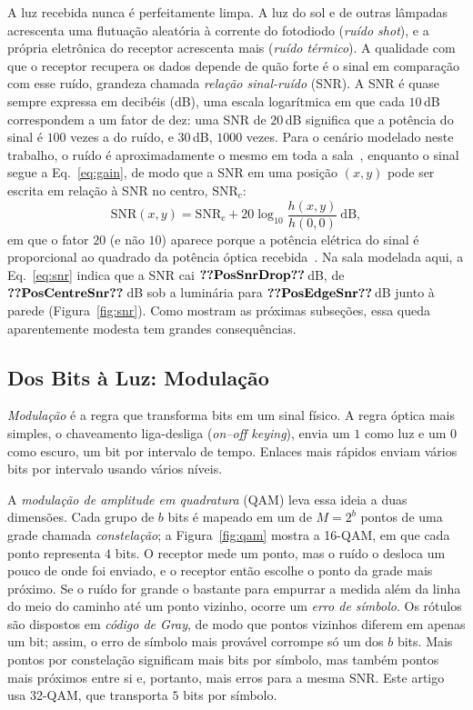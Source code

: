 A luz recebida nunca é perfeitamente limpa. A luz do sol e de outras lâmpadas
acrescenta uma flutuação aleatória à corrente do fotodiodo (\emph{ruído
shot}), e a própria eletrônica do receptor acrescenta mais (\emph{ruído
térmico}). A qualidade com que o receptor recupera os dados depende de quão
forte é o sinal em comparação com esse ruído, grandeza chamada \emph{relação
sinal-ruído} (SNR). A SNR é quase sempre expressa em decibéis (dB), uma escala
logarítmica em que cada $10$\,dB correspondem a um fator de dez: uma SNR de
$20$\,dB significa que a potência do sinal é $100$ vezes a do ruído, e
$30$\,dB, $1000$ vezes. Para o cenário modelado neste trabalho, o ruído é aproximadamente o mesmo em toda a sala~\cite{almoliki2022lci}, 
enquanto o sinal segue a Eq.~\eqref{eq:gain}, de modo que a SNR em uma posição $(x,y)$
pode ser escrita em relação à SNR no centro, $\mathrm{SNR}_{c}$:
\begin{equation}
\mathrm{SNR}(x,y) = \mathrm{SNR}_{c} + 20\log_{10}\frac{h(x,y)}{h(0,0)} \ \text{dB},
\label{eq:snr}
\end{equation}
em que o fator $20$ (e não $10$) aparece porque a potência elétrica do sinal é
proporcional ao quadrado da potência óptica
recebida~\cite{kahn1997wireless}. Na sala modelada aqui, a
Eq.~\eqref{eq:snr} indica que a SNR cai $\val{PosSnrDrop}$\,dB, de
$\val{PosCentreSnr}$\,dB sob a luminária para $\val{PosEdgeSnr}$\,dB junto à
parede (Figura~\ref{fig:snr}). Como mostram as próximas subseções, essa queda
aparentemente modesta tem grandes consequências.

\subsection{Dos Bits à Luz: Modulação}\label{sec:fund-mod}
\emph{Modulação} é a regra que transforma bits em um sinal físico. A regra
óptica mais simples, o chaveamento liga-desliga (\emph{on--off keying}), envia
um $1$ como luz e um $0$ como escuro, um bit por intervalo de tempo. Enlaces
mais rápidos enviam vários bits por intervalo usando vários níveis.

A \emph{modulação de amplitude em quadratura} (QAM) leva essa ideia a duas
dimensões. Cada grupo de $b$ bits é mapeado em um de $M=2^{b}$ pontos de uma
grade chamada \emph{constelação}; a Figura~\ref{fig:qam} mostra a 16-QAM, em que
cada ponto representa $4$ bits. O receptor mede um ponto, mas o ruído o desloca
um pouco de onde foi enviado, e o receptor então escolhe o ponto da grade mais
próximo. Se o ruído for grande o bastante para empurrar a medida além da linha
do meio do caminho até um ponto vizinho, ocorre um \emph{erro de símbolo}. Os
rótulos são dispostos em \emph{código de Gray}, de modo que pontos vizinhos
diferem em apenas um bit; assim, o erro de símbolo mais provável corrompe só um
dos $b$ bits. Mais pontos por constelação significam mais bits por símbolo, mas
também pontos mais próximos entre si e, portanto, mais erros para a mesma SNR.
Este artigo usa 32-QAM, que transporta $5$ bits por símbolo.

